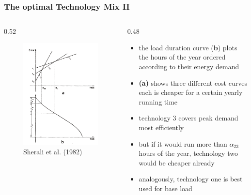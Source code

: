 \begin{frame}

\frametitle{The optimal Technology Mix II}
\begin{columns}
\begin{column} {0.52\textwidth}

\begin{figure}[h]
\centering
\includegraphics[width=1.\textwidth]{capacity/technology_choice_sherali}
    \caption{Sherali et al. (1982)}
    \label{fig:Daten 2004}            
\end{figure}
\end{column}

\begin{column} {0.48\textwidth}
\begin{itemize}
\item the load duration curve (\textbf{b}) plots the hours of the year ordered according to their energy demand
\item \textbf{(a)} shows three different cost curves each is cheaper for a certain yearly running time
\item technology 3 covers peak demand most efficiently 
\item but if it would run more than $\alpha_{23}$ hours of the year, technology two would be cheaper already
\item analogously, technology one is best used for base load
\end {itemize}

\end{column}
\end{columns}

\end{frame}	
